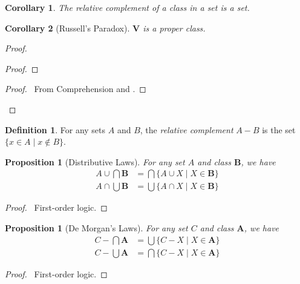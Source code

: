 \documentclass{book}
\let\qed\relax
\newtheorem{prop}[ax]{Proposition}
\newtheorem{cor}{Corollary}[ax]
\theoremstyle{definition}
\newtheorem{df}[ax]{Definition}
\begin{document}
\begin{cor}
The relative complement of a class in a set is a set.
\end{cor}

\begin{cor}[Russell's Paradox]
$\mathbf{V}$ is a proper class.
\end{cor}

\begin{proof}
\pf
{}
\begin{proof}
\end{proof}
\begin{proof}
	\pf\ From Comprehension and .
\end{proof}
\qed
\end{proof}

\begin{df}
For any sets $A$ and $B$, the \emph{relative complement} $A-B$ is the set $\{x \in A \mid x \notin B\}$.
\end{df}

\begin{prop}[Distributive Laws]
For any set $A$ and class $\mathbf{B}$, we have
\begin{align*}
A \cup \bigcap \mathbf{B} & = \bigcap \{ A \cup X \mid X \in \mathbf{B} \} \\
A \cap \bigcup \mathbf{B} & = \bigcup \{ A \cap X \mid X \in \mathbf{B} \}
\end{align*}
\end{prop}

\begin{proof}
\pf\ First-order logic. \qed
\end{proof}

\begin{prop}[De Morgan's Laws]
For any set $C$ and class $\mathbf{A}$, we have
\begin{align*}
C - \bigcap \mathbf{A} & = \bigcup \{ C - X \mid X \in \mathbf{A} \} \\
C - \bigcup \mathbf{A} & = \bigcap \{ C - X \mid X \in \mathbf{A} \}
\end{align*}
\end{prop}

\begin{proof}
\pf\ First-order logic. \qed
\end{proof}
\end{document}
